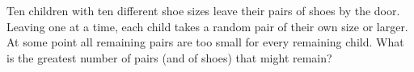 Ten children with ten different shoe sizes leave their pairs of shoes by the door. Leaving one at a time, each child takes a random pair of their own size or larger. At some point all remaining pairs are too small for every remaining child. What is the greatest number of pairs (and of shoes) that might remain?
